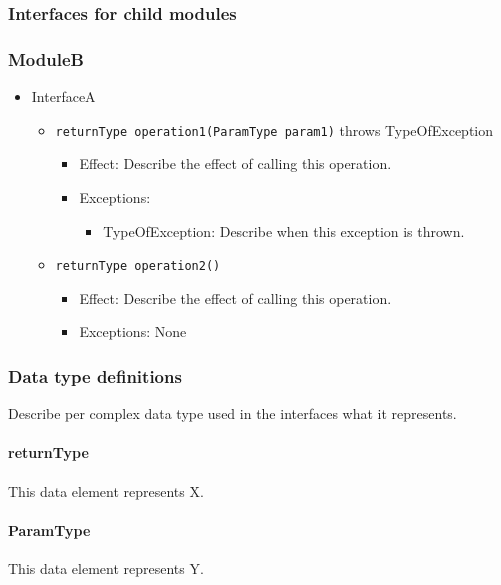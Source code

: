 \documentclass[a4paper,10pt]{article}
\begin{document}
\subsubsection{Interfaces for child modules}
\subsubsection*{ModuleB}
\begin{itemize}
    \item InterfaceA
    \begin{itemize}
        \item \texttt{returnType operation1(ParamType param1)} throws TypeOfException
        \begin{itemize}
            \item Effect: Describe the effect of calling this operation.
            \item Exceptions: 
            \begin{itemize}
                \item TypeOfException: Describe when this exception is thrown.
            \end{itemize}
        \end{itemize}

        \item \texttt{returnType operation2()}
        \begin{itemize}
            \item Effect: Describe the effect of calling this operation.
            \item Exceptions: None
         \end{itemize}
    \end{itemize}
\end{itemize}

\subsubsection{Data type definitions}
Describe per complex data type used in the interfaces what it represents.

\paragraph{returnType} This data element represents X.

\paragraph{ParamType} This data element represents Y.
\end{document}
